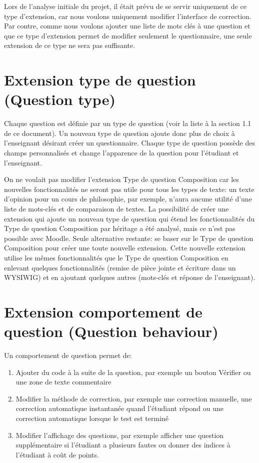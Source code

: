 Lors de l'analyse initiale du projet, il était prévu de se servir uniquement de ce type d'extension, car nous voulons uniquement modifier l'interface de correction.
Par contre, comme nous voulons ajouter une liste de mots clés à une question et que ce type d'extension permet de modifier seulement le questionnaire, une seule extension de ce type ne sera pas suffisante.

\section{Extension type de question (Question type)}

Chaque question est définie par un type de question (voir la liste à la section 1.1 de ce document).
Un nouveau type de question ajoute donc plus de choix à l'enseignant désirant créer un questionnaire.
Chaque type de question possède des champs personnalisés et change l'apparence de la question pour l'étudiant et l'enseignant.

On ne voulait pas modifier l'extension \og Type de question Composition \fg{} car les nouvelles fonctionnalités ne seront pas utile pour tous les types de texte: un texte d'opinion pour un cours de philosophie, par exemple, n'aura aucune utilité d'une liste de mots-clés et de comparaison de textes.
La possibilité de créer une extension qui ajoute un nouveau type de question qui étend les fonctionnalités du \og Type de question Composition \fg{} par héritage a été analysé, mais ce n'est pas possible avec Moodle.
Seule alternative restante: se baser sur le \og Type de question Composition \fg{} pour créer une toute nouvelle extension.
Cette nouvelle extension utilise les mêmes fonctionnalités que le \og Type de question Composition \fg{} en enlevant quelques fonctionnalités (remise de pièce jointe et écriture dans un WYSIWIG) et en ajoutant quelques autres (mots-clés et réponse de l'enseignant).

\section{Extension comportement de question (Question behaviour)}

Un comportement de question permet de:
\begin{enumerate}
  \item Ajouter du code à la suite de la question, par exemple un bouton \og Vérifier \fg{} ou une zone de texte commentaire
  \item Modifier la méthode de correction, par exemple une correction manuelle, une correction automatique instantanée quand l'étudiant répond ou une correction automatique lorsque le test est terminé
  \item Modifier l'affichage des questions, par exemple afficher une question supplémentaire si l'étudiant a plusieurs fautes ou donner des indices à l'étudiant à coût de points.
\end{enumerate}

